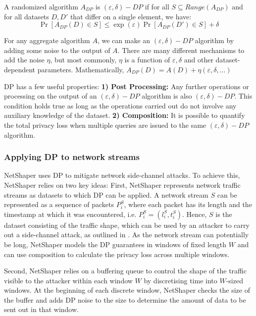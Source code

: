 \begin{definition}
  \label{def:dp}
  A randomized algorithm $A_{DP}$ is $(\varepsilon, \delta)-DP$ if for all ${S} \subseteq Range(A_{DP})$ and for all datasets $D, D'$ that differ on a single element, we have:
  \begin{equation*}
    \Pr[A_{DP}(D) \in S] \leq \exp(\varepsilon)\Pr[A_{DP}(D') \in S] + \delta
  \end{equation*}
\end{definition}

For any aggregate algorithm $A$, we can make an $(\varepsilon, \delta)-DP$ algorithm by adding some noise to the output of $A$.
There are many different mechanisms to add the noise $\eta$, but most commonly, $\eta$ is a function of $\varepsilon, \delta$ and other dataset-dependent parameters. 
Mathematically, $A_{DP}(D) = A(D) + \eta(\varepsilon, \delta, ...)$

DP has a few useful properties: 
\textbf{1) Post Processing:} Any further operations or processing on the output of an $(\varepsilon, \delta)-DP$ algorithm is also $(\varepsilon, \delta)-DP$.
This condition holds true as long as the operations carried out do not involve any auxiliary knowledge of the dataset.
\textbf{2) Composition:} It is possible to quantify the total privacy loss when multiple queries are issued to the same $(\varepsilon, \delta)-DP$ algorithm.

\subsubsection{Applying DP to network streams}
\label{subsubsec:netshaper-background-framework-applying-dp}
NetShaper uses DP to mitigate network side-channel attacks. 
To achieve this, NetShaper relies on two key ideas: 
First, NetShaper represents network traffic streams as datasets to which DP can be applied.
A network stream $S$ can be represented as a sequence of packets $P_i^S$, where each packet has its length and the timestamp at which it was encountered, i.e. $P_i^S = (l_i^S, t_i^S)$.
Hence, $S$ is the dataset consisting of the traffic shape, which can be used by an attacker to carry out a side-channel attack, as outlined in .
As the network stream can potentially be long, NetShaper models the DP guarantees in windows of fixed length $W$ and can use composition to calculate the privacy loss across multiple windows.

Second, NetShaper relies on a buffering queue to control the shape of the traffic visible to the attacker within each window $W$ by discretising time into $W$-sized windows.
At the beginning of each discrete window, NetShaper checks the size of the buffer and adds DP noise to the size to determine the amount of data to be sent out in that window.


